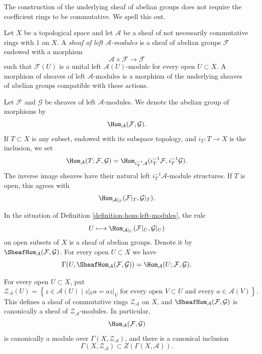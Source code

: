 \medskip\noindent
The construction of the underlying sheaf of abelian groups does not
require the coefficient rings to be commutative. We spell this out.

\begin{definition}
\label{definition-hom-left-modules}
Let $X$ be a topological space and let $\mathcal{A}$ be a sheaf of
not necessarily commutative rings with $1$ on $X$.
A {\it sheaf of left $\mathcal{A}$-modules} is a sheaf of abelian
groups $\mathcal{F}$ endowed with a morphism
$$
\mathcal{A} \times \mathcal{F} \longrightarrow \mathcal{F}
$$
such that $\mathcal{F}(U)$ is a unital left
$\mathcal{A}(U)$-module for every open $U \subset X$.
A morphism of sheaves of left $\mathcal{A}$-modules is a morphism
of the underlying sheaves of abelian groups compatible with these
actions.

Let $\mathcal{F}$ and $\mathcal{G}$ be sheaves of left
$\mathcal{A}$-modules. We denote the abelian group of morphisms by
$$
\Hom_{\mathcal{A}}(\mathcal{F}, \mathcal{G}).
$$
If $T \subset X$ is any subset, endowed with its subspace topology,
and $i_T : T \to X$ is the inclusion, we set
$$
\Hom_{\mathcal{A}}(T; \mathcal{F}, \mathcal{G})
=
\Hom_{i_T^{-1}\mathcal{A}}
(i_T^{-1}\mathcal{F}, i_T^{-1}\mathcal{G}).
$$
The inverse image sheaves have their natural left
$i_T^{-1}\mathcal{A}$-module structures. If $T$ is open, this agrees
with
$$
\Hom_{\mathcal{A}|_T}
(\mathcal{F}|_T, \mathcal{G}|_T).
$$
\end{definition}

\begin{lemma}
\label{lemma-sheaf-hom-left-modules}
In the situation of
Definition \ref{definition-hom-left-modules}, the rule
$$
U \longmapsto
\Hom_{\mathcal{A}|_U}
(\mathcal{F}|_U, \mathcal{G}|_U)
$$
on open subsets of $X$ is a sheaf of abelian groups. Denote it by
$\SheafHom_{\mathcal{A}}(\mathcal{F}, \mathcal{G})$. For every open
$U \subset X$ we have
$$
\Gamma(U, \SheafHom_{\mathcal{A}}(\mathcal{F}, \mathcal{G}))
=
\Hom_{\mathcal{A}}(U; \mathcal{F}, \mathcal{G}).
$$

For every open $U \subset X$, put
$$
\mathcal{Z}_{\mathcal{A}}(U)
=
\left\{
z \in \mathcal{A}(U) \mid
z|_V a = a z|_V
\text{ for every open }V \subset U
\text{ and every }a \in \mathcal{A}(V)
\right\}.
$$
This defines a sheaf of commutative rings
$\mathcal{Z}_{\mathcal{A}}$ on $X$, and
$\SheafHom_{\mathcal{A}}(\mathcal{F}, \mathcal{G})$
is canonically a sheaf of
$\mathcal{Z}_{\mathcal{A}}$-modules. In particular,
$$
\Hom_{\mathcal{A}}(\mathcal{F}, \mathcal{G})
$$
is canonically a module over
$\Gamma(X, \mathcal{Z}_{\mathcal{A}})$, and there is a canonical
inclusion
$$
\Gamma(X, \mathcal{Z}_{\mathcal{A}})
\subset
Z(\Gamma(X, \mathcal{A})).
$$
\end{lemma}

